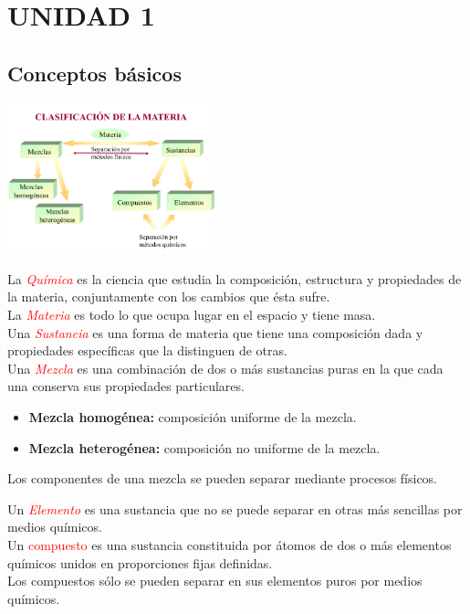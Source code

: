 \section{UNIDAD 1}
    \subsection{Conceptos básicos}

        \begin{center} \includegraphics[width=6cm]{./imagenes/clasificacionMateria.png} \end{center}

        \indent La \textcolor{red}{\textit{Química}} es la ciencia que estudia la composición, estructura y propiedades de la materia, conjuntamente con los cambios que ésta sufre. \\
        \indent La \textcolor{red}{\textit{Materia}} es todo lo que ocupa lugar en el espacio y tiene masa. \\
        \indent Una \textcolor{red}{\textit{Sustancia}} es una forma de materia que tiene una composición dada y propiedades específicas que la distinguen de otras. \\
        \indent Una \textcolor{red}{\textit{Mezcla}} es una combinación de dos o más sustancias puras en la que cada una conserva sus propiedades particulares.

        \begin{itemize} 
            \item \textbf{Mezcla homogénea:} composición uniforme de la mezcla.
            \item \textbf{Mezcla heterogénea:} composición no uniforme de la mezcla.
        \end{itemize}   

        Los componentes de una mezcla se pueden separar mediante procesos físicos.

        \indent Un \textcolor{red}{\textit{Elemento}} es una sustancia que no se puede separar en otras más sencillas por medios químicos. \\
        \indent Un \textcolor{red}{compuesto} es una sustancia constituida por átomos de dos o más elementos químicos unidos en proporciones fijas definidas. \\
        Los compuestos sólo se pueden separar en sus elementos puros por medios químicos. \\
       
